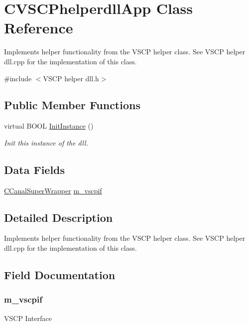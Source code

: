 \hypertarget{class_c_v_s_c_phelperdll_app}{
\section{CVSCPhelperdllApp Class Reference}
\label{dc/d59/class_c_v_s_c_phelperdll_app}
}


Implements helper functionality from the VSCP helper class. See VSCP helper dll.cpp for the implementation of this class.  




{\ttfamily \#include $<$VSCP helper dll.h$>$}

\subsection*{Public Member Functions}
\begin{DoxyCompactItemize}
\item 
\hypertarget{class_c_v_s_c_phelperdll_app_ace8106a36b0c263b6797f965a84287bd}{
virtual BOOL \hyperlink{class_c_v_s_c_phelperdll_app_ace8106a36b0c263b6797f965a84287bd}{InitInstance} ()}
\label{dc/d59/class_c_v_s_c_phelperdll_app_ace8106a36b0c263b6797f965a84287bd}

\begin{DoxyCompactList}\small\item\em Init this instance of the dll. \end{DoxyCompactList}\end{DoxyCompactItemize}
\subsection*{Data Fields}
\begin{DoxyCompactItemize}
\item 
\hyperlink{class_c_canal_super_wrapper}{CCanalSuperWrapper} \hyperlink{class_c_v_s_c_phelperdll_app_ac61bc73be2e25efd3ec56dd5e4f22b51}{m\_\-vscpif}
\end{DoxyCompactItemize}


\subsection{Detailed Description}
Implements helper functionality from the VSCP helper class. See VSCP helper dll.cpp for the implementation of this class. 

\subsection{Field Documentation}
\hypertarget{class_c_v_s_c_phelperdll_app_ac61bc73be2e25efd3ec56dd5e4f22b51}{
\subsubsection[{m\_\-vscpif}]{ {\bf m\_\-vscpif}}}
\label{dc/d59/class_c_v_s_c_phelperdll_app_ac61bc73be2e25efd3ec56dd5e4f22b51}
VSCP Interface 

